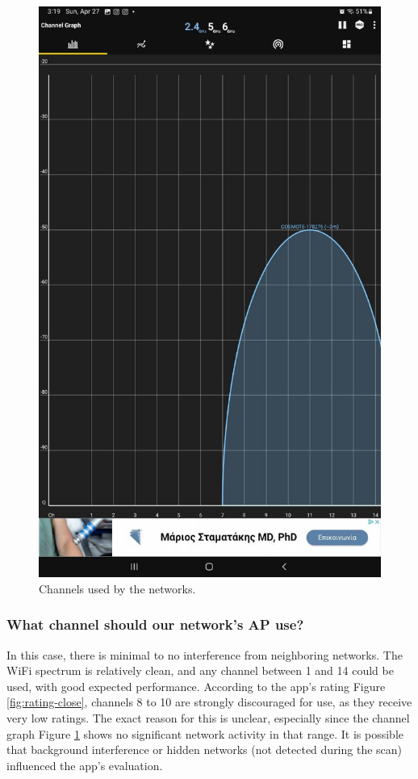 \documentclass{article}
\begin{document}
\begin{figure}
    \centering
    \includegraphics[width=1\linewidth]{images/channels_used_close.jpg}
    \caption{Channels used by the networks.}
    \label{fig:channels-used-close}
\end{figure}

\subsubsection{What channel should our network's AP use?}

In this case, there is minimal to no interference from neighboring networks.
The WiFi spectrum is relatively clean, and any channel between 1 and 14 could be used, with good expected performance.
According to the app's rating Figure \ref{fig:rating-close}, channels 8 to 10 are strongly discouraged for use, as they receive very low ratings.
The exact reason for this is unclear, especially since the channel graph Figure \ref{fig:channels-used-close} shows no significant network activity in that range.
It is possible that background interference or hidden networks (not detected during the scan) influenced the app’s evaluation.
\end{document}
